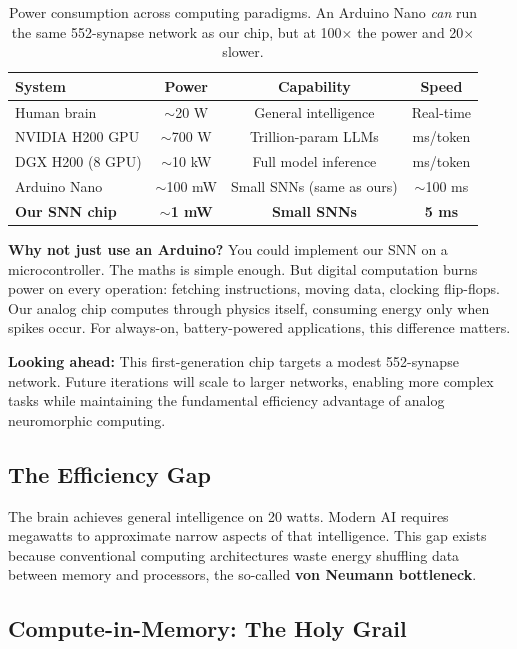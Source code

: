 \documentclass[11pt,a4paper]{article}
\begin{document}
\begin{table}[H]
\centering
\begin{tabular}{lccc}
\toprule
\textbf{System} & \textbf{Power} & \textbf{Capability} & \textbf{Speed} \\
\midrule
Human brain & $\sim$20 W & General intelligence & Real-time \\
NVIDIA H200 GPU & $\sim$700 W & Trillion-param LLMs & ms/token \\
DGX H200 (8 GPU) & $\sim$10 kW & Full model inference & ms/token \\
Arduino Nano & $\sim$100 mW & Small SNNs (same as ours) & $\sim$100 ms \\
\textbf{Our SNN chip} & $\sim$\textbf{1 mW} & \textbf{Small SNNs} & \textbf{5 ms} \\
\bottomrule
\end{tabular}
\caption{Power consumption across computing paradigms. An Arduino Nano \textit{can} run the same 552-synapse network as our chip, but at 100$\times$ the power and 20$\times$ slower.}
\end{table}

\begin{tcolorbox}[infobox]
\textbf{Why not just use an Arduino?} You could implement our SNN on a microcontroller. The maths is simple enough. But digital computation burns power on every operation: fetching instructions, moving data, clocking flip-flops. Our analog chip computes through physics itself, consuming energy only when spikes occur. For always-on, battery-powered applications, this difference matters.

\textbf{Looking ahead:} This first-generation chip targets a modest 552-synapse network. Future iterations will scale to larger networks, enabling more complex tasks while maintaining the fundamental efficiency advantage of analog neuromorphic computing.
\end{tcolorbox}

\subsection{The Efficiency Gap}

The brain achieves general intelligence on 20 watts. Modern AI requires megawatts to approximate narrow aspects of that intelligence. This gap exists because conventional computing architectures waste energy shuffling data between memory and processors, the so-called \textbf{von Neumann bottleneck}.

\subsection{Compute-in-Memory: The Holy Grail}
\end{document}
